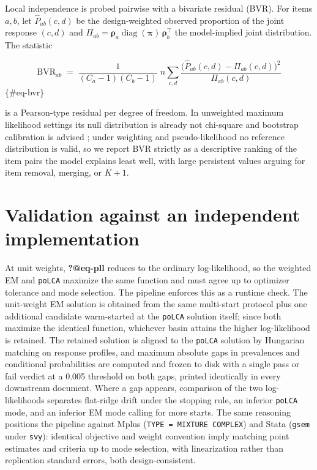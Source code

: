 \documentclass[
  12pt]{article}
\begin{document}
Local independence is probed pairwise with a bivariate residual (BVR).
For items \(a, b\), let \(\widehat{P}_{ab}(c,d)\) be the design-weighted
observed proportion of the joint response \((c,d)\) and
\(\Pi_{ab} = \boldsymbol\rho_a \operatorname{diag}(\boldsymbol\pi)\, \boldsymbol\rho_b^{\top}\)
the model-implied joint distribution. The statistic

\[\mathrm{BVR}_{ab} \;=\; \frac{1}{(C_a - 1)(C_b - 1)}
\; n \sum_{c,d} \frac{\big( \widehat{P}_{ab}(c,d) - \Pi_{ab}(c,d) \big)^2}{\Pi_{ab}(c,d)}\]
\{\#eq-bvr\}

is a Pearson-type residual per degree of freedom. In unweighted maximum
likelihood settings its null distribution is already not chi-square and
bootstrap calibration is advised \citep{oberski2013}; under weighting
and pseudo-likelihood no reference distribution is valid, so we report
BVR strictly as a descriptive ranking of the item pairs the model
explains least well, with large persistent values arguing for item
removal, merging, or \(K+1\).

\section{Validation against an independent
implementation}\label{sec-validation}

At unit weights, \textbf{?@eq-pll} reduces to the ordinary
log-likelihood, so the weighted EM and \texttt{poLCA} \citep{linzer2011}
maximize the same function and must agree up to optimizer tolerance and
mode selection. The pipeline enforces this as a runtime check. The
unit-weight EM solution is obtained from the same multi-start protocol
plus one additional candidate warm-started at the \texttt{poLCA}
solution itself; since both maximize the identical function, whichever
basin attains the higher log-likelihood is retained. The retained
solution is aligned to the \texttt{poLCA} solution by Hungarian matching
on response profiles, and maximum absolute gaps in prevalences and
conditional probabilities are computed and frozen to disk with a single
pass or fail verdict at a 0.005 threshold on both gaps, printed
identically in every downstream document. Where a gap appears,
comparison of the two log-likelihoods separates flat-ridge drift under
the stopping rule, an inferior \texttt{poLCA} mode, and an inferior EM
mode calling for more starts. The same reasoning positions the pipeline
against Mplus (\texttt{TYPE\ =\ MIXTURE\ COMPLEX}) and Stata
(\texttt{gsem} under \texttt{svy}): identical objective and weight
convention imply matching point estimates and criteria up to mode
selection, with linearization rather than replication standard errors,
both design-consistent.
\end{document}
